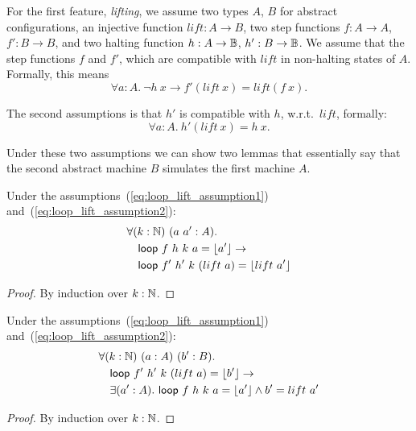 For the first feature, \emph{lifting}, we assume two types $A$, $B$ for abstract configurations, an injective function $lift : A \to B$, two step
functions $f : A \to A$, $f' : B \to B$, and two halting function $h : A \rightarrow \mathbb{B}$, $h' : B \rightarrow \mathbb{B}$.  We assume that the step functions $f$ and
$f'$, which are compatible with $lift$ in non-halting states of $A$.  Formally, this means
\begin{equation}
  \label{eq:loop_lift_assumption1}
  \forall a:A.~\lnot h~x \rightarrow f' (lift~x) = lift (f~x).
\end{equation}

The second assumptions is that $h'$ is compatible with $h$, w.r.t.\ $lift$, formally:
\begin{equation}
  \label{eq:loop_lift_assumption2}
  \forall a:A.~h'(lift~x)=h~x.
\end{equation}

Under these two assumptions we can show two lemmas that essentially say that the second abstract machine $B$ simulates the first machine $A$.
\begin{lemma}
  \label{lem:loop_lift}
  Under the assumptions~(\ref{eq:loop_lift_assumption1}) and~(\ref{eq:loop_lift_assumption2}):
  \begin{alignat*}{1}
    & \forall (k:\mathbb{N})~(a~a' : A). \\
    & \quad \textsf{loop}~f ~h ~k~a = \left\lfloor {a'} \right\rfloor \rightarrow \\
    & \quad \textsf{loop}~f'~h'~k~(lift~a) = \left\lfloor {lift~a'} \right\rfloor
  \end{alignat*}
\end{lemma}
\begin{proof}
  By induction over $k:\mathbb{N}$.
\end{proof}
\begin{lemma}
  \label{lem:loop_unlift}
  Under the assumptions~(\ref{eq:loop_lift_assumption1}) and~(\ref{eq:loop_lift_assumption2}):
  \begin{alignat*}{1}
    & \forall (k:\mathbb{N})~(a:A)~(b':B). \\
    & \quad \textsf{loop}~f'~h'~k~(lift~a) = \left\lfloor {b'} \right\rfloor \rightarrow \\
    & \quad \exists (a':A).~\textsf{loop}~f~h~k~a = \left\lfloor {a'} \right\rfloor \land b'=lift~a'
  \end{alignat*}
\end{lemma}
\begin{proof}
  By induction over $k:\mathbb{N}$.
\end{proof}

